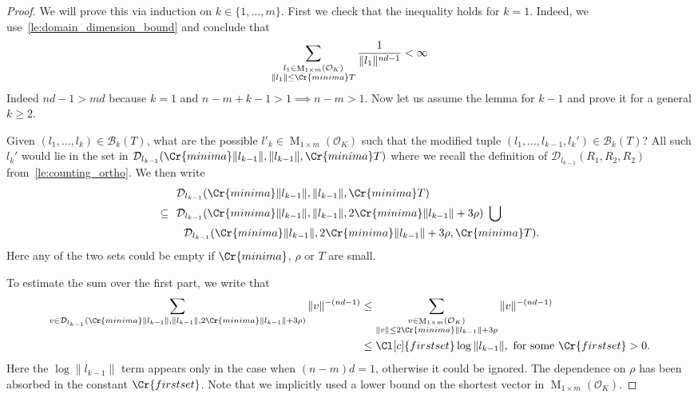 \documentclass{amsart}
\theoremstyle{definition}
\theoremstyle{remark}
\newcommand{\OK}{\mathcal{O}_K}
\DeclareMathOperator{\M}{M}
\begin{document}
\begin{proof}
    We will prove this via induction on $k  \in \{1,\dots,m\}$. 
    First we check that the inequality holds for $k=1$.
    Indeed, we use~\cref{le:domain_dimension_bound} and conclude that
    \begin{equation}
        \sum_{\substack{l_{1} \in \M_{1 \times m}(\OK) \\ \|l_{1}\| \leq \Cr{minima} T} }^{} \frac{1}{\|l_{1}\|^{nd-1}}  < \infty
    \end{equation}
    Indeed $nd-1 > md$ because $k=1$ and $n-m +k -1> 1  \implies  n-m > 1$.
    Now let us assume the lemma for $k-1$ and prove it for a general $k \geq 2$.

    Given $(l_{1},\dots,l_{k}) \in \mathcal{B}_{k}(T)$, 
    what are the possible $l'_k \in \M_{ 1 \times m}(\OK)$ such that the modified tuple $(l_{1},\dots,l_{k-1},l_{k}')\in \mathcal{B}_{k}(T)$? 
    All such $l_{k}'$ would lie in the set
    in $\mathcal{D}_{l_{k-1}}( \Cr{minima} \|l_{k-1}\|,\|l_{k-1}\| ,\Cr{minima}T)$ 
    where we recall the definition of 
    $\mathcal{D}_{l_{k-1}}(R_{1},R_{2},R_{2})$
    from~\cref{le:counting_ortho}. 
    We then write
    \begin{align}
         &  \mathcal{D}_{l_{k-1}}( \Cr{minima} \|l_{k-1}\|,\|l_{k-1}\| ,\Cr{minima}T) \\
 \subseteq \ \ 
 &
 \mathcal{D}_{l_{k-1}}( \Cr{minima} \|l_{k-1}\|,\|l_{k-1}\| , 2 \Cr{minima} \|l_{k-1}\| + 3\rho)
 \ \bigcup \\
 &   \ \ 
 \mathcal{D}_{l_{k-1}}( \Cr{minima} \|l_{k-1}\|,2 \Cr{minima}\|l_{k-1}\|  + 3\rho,\Cr{minima}T)   .
    \end{align}
Here any of the two sets could be empty if $\Cr{minima}$, $\rho$ or $T$ are small.

To estimate the sum over the first part, we write that 
\begin{align}
    \sum_{ v \in \mathcal{D}_{l_{k-1}}( \Cr{minima} \|l_{k-1}\|,\|l_{k-1}\| , 2 \Cr{minima} \|l_{k-1}\| + 3\rho)} \|v\|^{-(nd-1)} 
     &  
    \leq \sum_{\substack{v \in \M_{1 \times m}(\OK) \\ \|v\| \leq 2 \Cr{minima} \|l_{k-1}\| + 3 \rho} }  \|v\|^{-(nd-1)} \\ 
     & \leq  \Cl[c]{firstset} \log \|l_{k-1}\|, \text{ for some } \Cr{firstset} >0.
\end{align}
Here the $ \log \|l_{k-1}\|$ term appears only in the case when $(n-m)d=1$, otherwise it could be ignored. The dependence on $\rho$ has been absorbed in the constant $\Cr{firstset}$. Note that we implicitly used a lower bound on the shortest vector in $\M_{1 \times m}(\OK)$.


\end{proof}
\end{document}
